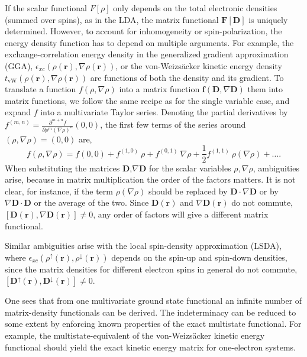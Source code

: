 \documentclass[journal=jacsat,manuscript=article]{achemso}
\newcommand\m[1]{\mathbf{#1}}
\renewcommand\vec[1]{\mathbf{#1}}
\begin{document}
If the scalar functional $F[\rho]$ only depends on the total electronic densities (summed over spins), as in the LDA,
the matrix functional $\m{F}[\m{D}]$ is uniquely determined. However, to account for inhomogeneity or spin-polarization,
the energy density function has to depend on multiple arguments. For example, the exchange-correlation energy density in
the generalized gradient approximation (GGA), $\epsilon_{xc}(\rho(\vec{r}),\nabla \rho(\vec{r}))$, 
or the von-Weizs\"{a}cker kinetic energy density $t_{\text{vW}}(\rho(\vec{r}),\nabla \rho(\vec{r}))$ are functions of both the density and its gradient.
To translate a function $f(\rho,\nabla \rho)$ into a matrix function $\m{f}(\m{D},\nabla \m{D})$ them into matrix functions,
we follow the same recipe as for the single variable case, and expand $f$ into a multivariate Taylor series.
Denoting the partial derivatives by $f^{(m,n)} = \frac{\partial^{m+n} f}{\partial \rho^{m} (\nabla \rho)^{n}}(0,0)$, the first few terms
of the series around $(\rho,\nabla \rho) = (0,0)$ are,
\begin{equation}
 f(\rho,\nabla \rho) = f(0,0) + f^{(1,0)}~\rho + f^{(0,1)} ~ \nabla \rho + \frac{1}{2} f^{(1,1)} ~ \rho(\nabla \rho) + \ldots.
\end{equation}
When substituting the matrices $\m{D}$,$\nabla \m{D}$ for the scalar variables $\rho,\nabla \rho$, ambiguities arise,
because in matrix multiplication the order of the factors matters. It is not clear, for instance,
if the term $\rho (\nabla \rho)$
should be replaced by $\m{D} \cdot \nabla  \m{D}$ or by $\nabla \m{D} \cdot \m{D}$
or the average of the two. Since $\m{D}(\vec{r})$ and $\nabla \m{D}(\vec{r})$ do not commute,
$[\m{D}(\vec{r}),\nabla \m{D}(\vec{r})] \neq 0$, any order of factors will give
a different matrix functional.

Similar ambiguities arise with the local spin-density approximation (LSDA),
where $\epsilon_{xc}(\rho^{\uparrow}(\vec{r}), \rho^{\downarrow}(\vec{r}))$
depends on the spin-up and spin-down densities, since the matrix densities for different electron spins
in general do not commute, $[\m{D}^{\uparrow}(\vec{r}), \m{D}^{\downarrow}(\vec{r})] \neq 0$.

One sees that from one multivariate ground state functional an infinite number of matrix-density functionals can be derived.
The indeterminacy can be reduced to some extent by enforcing known properties of the exact multistate functional.
For example, the multistate-equivalent of the von-Weizs\"{a}cker kinetic energy functional should yield the
exact kinetic energy matrix for one-electron systems.
\end{document}
